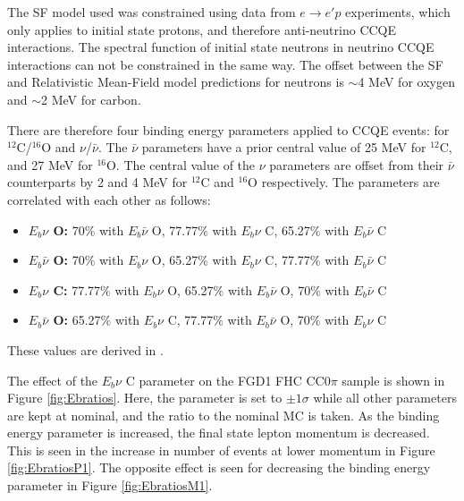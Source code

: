 The SF model used was constrained using data from $e\rightarrow e'p$ experiments, which only applies to initial state protons, and therefore anti-neutrino CCQE interactions. The spectral function of initial state neutrons in neutrino CCQE interactions can not be constrained in the same way. The offset between the SF and Relativistic Mean-Field model predictions \cite{RMFPred} for neutrons is $\sim$4 MeV for oxygen and $\sim$2 MeV for carbon. 

There are therefore four binding energy parameters applied to CCQE events: for $^{12}$C/$^{16}$O and $\nu$/$\bar{\nu}$. The $\bar{\nu}$ parameters have a prior central value of 25 MeV for $^{12}$C, and 27 MeV for $^{16}$O. The central value of the $\nu$ parameters are offset from their $\bar{\nu}$ counterparts by 2 and 4 MeV for $^{12}$C and $^{16}$O respectively. The parameters are correlated with each other as follows:

\begin{itemize}

\item \textbf{$E_{b}\nu$ O:} 70$\%$ with $E_{b}\bar{\nu}$ O, 77.77$\%$ with $E_{b}\nu$ C, 65.27$\%$ with $E_{b}\bar{\nu}$ C

\item \textbf{$E_{b}\bar{\nu}$ O:} 70$\%$ with $E_{b}\nu$ O, 65.27$\%$ with $E_{b}\nu$ C, 77.77$\%$ with $E_{b}\bar{\nu}$ C

\item \textbf{$E_{b}\nu$ C:} 77.77$\%$ with $E_{b}\nu$ O, 65.27$\%$ with $E_{b}\bar{\nu}$ O, 70$\%$ with $E_{b}\bar{\nu}$ C

\item \textbf{$E_{b}\bar{\nu}$ O:} 65.27$\%$ with $E_{b}\nu$ C, 77.77$\%$ with $E_{b}\bar{\nu}$ O, 70$\%$ with $E_{b}\nu$ C

\end{itemize}

These values are derived in \cite{tn344}.

The effect of the $E_b \nu$ C parameter on the FGD1 FHC CC0$\pi$ sample is shown in Figure \ref{fig:Ebratios}. Here, the parameter is set to $\pm1\sigma$ while all other parameters are kept at nominal, and the ratio to the nominal MC is taken. As the binding energy parameter is increased, the final state lepton momentum is decreased. This is seen in the increase in number of events at lower momentum in Figure \ref{fig:EbratiosP1}. The opposite effect is seen for decreasing the binding energy parameter in Figure \ref{fig:EbratiosM1}.

